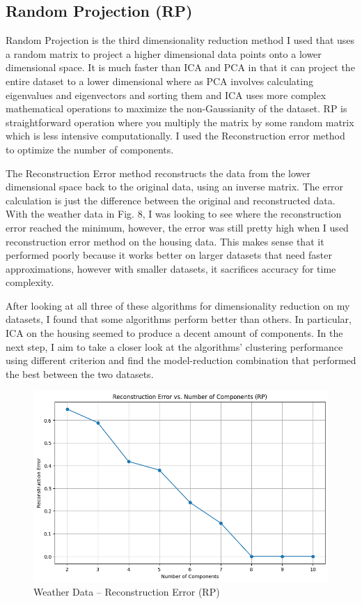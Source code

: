 \documentclass[conference]{IEEEtran}
\begin{document}
\subsection{Random Projection (RP)} 
\par Random Projection is the third dimensionality reduction method I used that uses a random matrix to project a higher dimensional data points onto a lower dimensional space. It is much faster than ICA and PCA in that it can project the entire dataset to a lower dimensional where as PCA involves calculating eigenvalues and eigenvectors and sorting them and ICA uses more complex mathematical operations to maximize the non-Gaussianity of the dataset. RP is straightforward operation where you multiply the matrix by some random matrix which is less intensive computationally. I used the Reconstruction error method to optimize the number of components. 
\par The Reconstruction Error method reconstructs the data from the lower dimensional space back to the original data, using an inverse matrix. The error calculation is just the difference between the original and reconstructed data. With the weather data in Fig. 8, I was looking to see where the reconstruction error reached the minimum, however, the error was still pretty high when I used reconstruction error method on the housing data. This makes sense that it performed poorly because it works better on larger datasets that need faster approximations, however with smaller datasets, it sacrifices accuracy for time complexity.
\par After looking at all three of these algorithms for dimensionality reduction on my datasets, I found that some algorithms perform better than others. In particular, ICA on the housing seemed to produce a decent amount of components. In the next step, I aim to take a closer look at the algorithms' clustering performance using different criterion and find the model-reduction combination that performed the best between the two datasets.
\begin{figure}
    \centering
    \includegraphics[width=0.9\linewidth]{figures//weather_figures/step_2d.png}

        \caption{Weather Data -- Reconstruction Error (RP)}
    \label{fig:8_weather_reconstruction
}
\end{figure}
\end{document}
